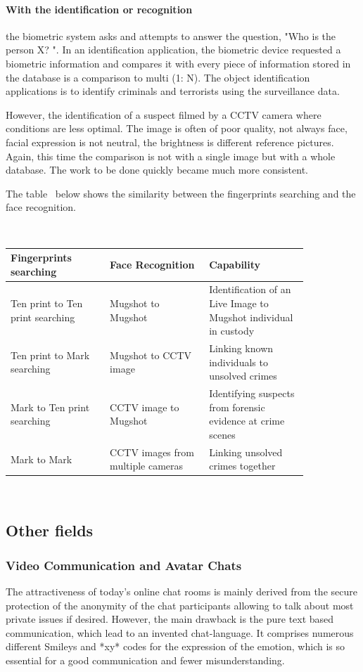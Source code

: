 \paragraph{With the identification or recognition} the biometric system asks and attempts to answer the question, "Who is the person X? ". In an identification application, the biometric device requested a biometric information and compares it with every piece of information stored in the database is a comparison to multi (1: N). The object identification applications is to identify criminals and terrorists using the surveillance data.

However, the identification of a suspect filmed by a CCTV camera where conditions are less optimal.
The image is often of poor quality, not always face, facial expression is not neutral, the brightness is different reference pictures.
Again, this time the comparison is not with a single image but with a whole database. The work to be done quickly became much more consistent.

The table~\cite{NPIA} below shows the similarity between the fingerprints searching and the face recognition.

~\\
\begin{tabular}{|p{0.28\linewidth}|p{0.28\linewidth}|p{0.28\linewidth}|}
\hline
\textbf{Fingerprints searching}&\textbf{Face Recognition}&\textbf{Capability}\\
\hline
Ten print to Ten print searching&Mugshot to Mugshot&Identification of an Live Image to Mugshot individual in custody\\
\hline
Ten print to Mark searching&Mugshot to CCTV image&Linking known individuals to unsolved crimes\\
\hline
Mark to Ten print searching&CCTV image to Mugshot&Identifying suspects from forensic evidence at crime scenes\\
\hline
Mark to Mark&CCTV images from multiple cameras&Linking unsolved crimes together\\
\hline
\end{tabular}

~\\

\subsection{Other fields}
\subsubsection*{Video Communication and Avatar Chats}
The attractiveness of today's online chat rooms is mainly derived from the secure protection of the anonymity of the chat participants allowing to talk about most private issues if desired. However, the main drawback is the pure text based communication, which lead to an invented chat-language. It comprises numerous different Smileys and *xy* codes for the expression of the emotion, which is so essential for a good communication and fewer misunderstanding.

